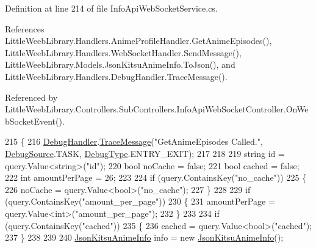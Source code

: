 Definition at line 214 of file Info\+Api\+Web\+Socket\+Service.\+cs.



References Little\+Weeb\+Library.\+Handlers.\+Anime\+Profile\+Handler.\+Get\+Anime\+Episodes(), Little\+Weeb\+Library.\+Handlers.\+Web\+Socket\+Handler.\+Send\+Message(), Little\+Weeb\+Library.\+Models.\+Json\+Kitsu\+Anime\+Info.\+To\+Json(), and Little\+Weeb\+Library.\+Handlers.\+Debug\+Handler.\+Trace\+Message().



Referenced by Little\+Weeb\+Library.\+Controllers.\+Sub\+Controllers.\+Info\+Api\+Web\+Socket\+Controller.\+On\+Web\+Socket\+Event().


\begin{DoxyCode}
215         \{
216             \mbox{\hyperlink{class_little_weeb_library_1_1_handlers_1_1_debug_handler}{DebugHandler}}.\mbox{\hyperlink{class_little_weeb_library_1_1_handlers_1_1_debug_handler_afccb37dfd6b2114af72000c2f4fe4607}{TraceMessage}}(\textcolor{stringliteral}{"GetAnimeEpisodes Called."}, 
      \mbox{\hyperlink{namespace_little_weeb_library_1_1_handlers_a2a6ca0775121c9c503d58aa254d292be}{DebugSource}}.TASK, \mbox{\hyperlink{namespace_little_weeb_library_1_1_handlers_ab66019ed40462876ec4e61bb3ccb0a62}{DebugType}}.ENTRY\_EXIT);
217 
218 
219             \textcolor{keywordtype}{string} \textcolor{keywordtype}{id} = query.Value<\textcolor{keywordtype}{string}>(\textcolor{stringliteral}{"id"});
220             \textcolor{keywordtype}{bool} noCache = \textcolor{keyword}{false};
221             \textcolor{keywordtype}{bool} cached = \textcolor{keyword}{false};
222             \textcolor{keywordtype}{int} amountPerPage = 26;
223 
224             \textcolor{keywordflow}{if} (query.ContainsKey(\textcolor{stringliteral}{"no\_cache"}))
225             \{
226                 noCache = query.Value<\textcolor{keywordtype}{bool}>(\textcolor{stringliteral}{"no\_cache"});
227             \}
228 
229             \textcolor{keywordflow}{if} (query.ContainsKey(\textcolor{stringliteral}{"amount\_per\_page"}))
230             \{
231                 amountPerPage = query.Value<\textcolor{keywordtype}{int}>(\textcolor{stringliteral}{"amount\_per\_page"});
232             \}
233 
234             \textcolor{keywordflow}{if} (query.ContainsKey(\textcolor{stringliteral}{"cached"}))
235             \{
236                 cached = query.Value<\textcolor{keywordtype}{bool}>(\textcolor{stringliteral}{"cached"});
237             \}
238 
239 
240             \mbox{\hyperlink{class_little_weeb_library_1_1_models_1_1_json_kitsu_anime_info}{JsonKitsuAnimeInfo}} info = \textcolor{keyword}{new} \mbox{\hyperlink{class_little_weeb_library_1_1_models_1_1_json_kitsu_anime_info}{JsonKitsuAnimeInfo}}();

\end{DoxyCode}
